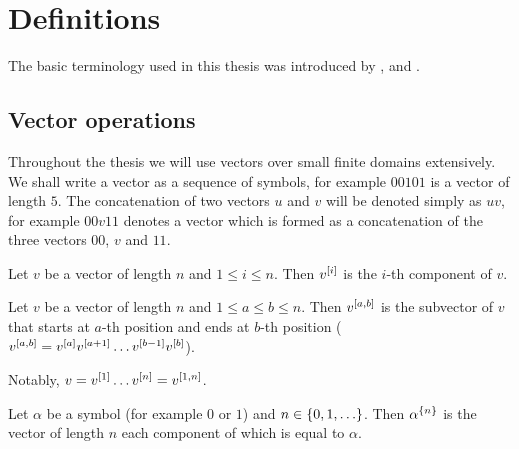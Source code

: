 \chapter{Definitions}

The basic terminology used in this thesis
was introduced by
\citet{Schieber2005154},
\citet{Dubovsky2012}
and \citet{Husek2014, Husek2015}.

\section{Vector operations}

Throughout the thesis we will use vectors
over small finite domains extensively.
We shall write a vector as a sequence of symbols,
for example $00101$ is a vector of length $5$.
The concatenation of two vectors $u$ and $v$
will be denoted simply as $uv$,
for example $00v11$ denotes a vector
which is formed as a concatenation
of the three vectors $00$, $v$ and $11$.

\begin{definition}
Let $v$ be a vector of length $n$ and $1 \leq i \leq n$.
Then $v^{[i]}$ is the $i$-th component of $v$.
\end{definition}

\begin{definition}
Let
$v$ be a vector of length $n$
and
$1 \leq a \leq b \leq n$.
Then $v^{[a, b]}$ is the subvector of $v$
that starts at $a$-th position
and ends at $b$-th position
($v^{[a, b]}
= v^{[a]} v^{[a+1]}
\ldots v^{[b-1]} v^{[b]}$).
\end{definition}

Notably,
$v = v^{[1]} \ldots v^{[n]} = v^{[1, n]}$.

\begin{definition}
Let $\alpha$ be a symbol (for example $0$ or $1$)
and $n \in \{0, 1, \ldots\}$.
Then $\alpha^{\{n\}}$ is the vector of length $n$
each component of which is equal to $\alpha$.
\end{definition}

